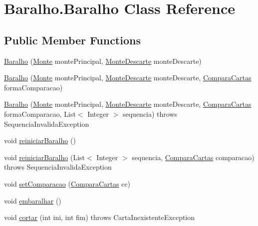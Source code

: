 \hypertarget{class_baralho_1_1_baralho}{
\section{Baralho.Baralho Class Reference}
\label{class_baralho_1_1_baralho}
}
\subsection*{Public Member Functions}
\begin{DoxyCompactItemize}
\item 
\hyperlink{class_baralho_1_1_baralho_ab88f90bd08144f150e97b45bd63eadfd}{Baralho} (\hyperlink{class_baralho_1_1_monte}{Monte} montePrincipal, \hyperlink{class_baralho_1_1_monte_descarte}{MonteDescarte} monteDescarte)
\item 
\hyperlink{class_baralho_1_1_baralho_a039c014d8bf91ceda3b003a1ee4d2418}{Baralho} (\hyperlink{class_baralho_1_1_monte}{Monte} montePrincipal, \hyperlink{class_baralho_1_1_monte_descarte}{MonteDescarte} monteDescarte, \hyperlink{interface_baralho_1_1_compara_cartas}{ComparaCartas} formaComparacao)
\item 
\hyperlink{class_baralho_1_1_baralho_a749ad25fed6cc2df5be8e1b2d8db5881}{Baralho} (\hyperlink{class_baralho_1_1_monte}{Monte} montePrincipal, \hyperlink{class_baralho_1_1_monte_descarte}{MonteDescarte} monteDescarte, \hyperlink{interface_baralho_1_1_compara_cartas}{ComparaCartas} formaComparacao, List$<$ Integer $>$ sequencia)  throws SequenciaInvalidaException
\item 
void \hyperlink{class_baralho_1_1_baralho_ae7ce198ebeadf6c0b3fb5ad109873f1c}{reiniciarBaralho} ()
\item 
void \hyperlink{class_baralho_1_1_baralho_a5d5b81ee3a6b48f6a99117172d23a24a}{reiniciarBaralho} (List$<$ Integer $>$ sequencia, \hyperlink{interface_baralho_1_1_compara_cartas}{ComparaCartas} comparacao)  throws SequenciaInvalidaException
\item 
void \hyperlink{class_baralho_1_1_baralho_a97297169abcfe6cdfe434b42bb121d5d}{setComparacao} (\hyperlink{interface_baralho_1_1_compara_cartas}{ComparaCartas} cc)
\item 
void \hyperlink{class_baralho_1_1_baralho_a50716e1d93b3ed27800ac62b7b9e8b8a}{embaralhar} ()
\item 
void \hyperlink{class_baralho_1_1_baralho_a6839090e52620e5b665a12aceeba06f6}{cortar} (int ini, int fim)  throws CartaInexistenteException
\item 

\end{DoxyCompactItemize}
